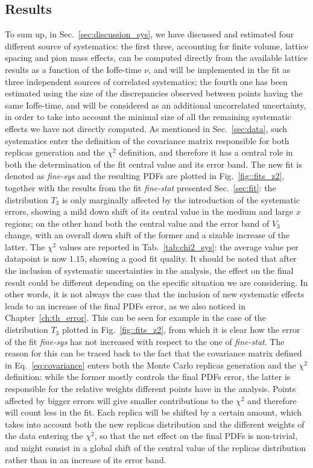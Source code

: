 \subsection{Results}
\label{sec:res}
%
To sum up, in Sec.~\ref{sec:discussion_sys}, we have discussed and estimated four different source of systematics: 
the first three, accounting for finite volume, lattice spacing and pion mass effects, can be computed directly from the available 
lattice results as a function of the Ioffe-time $\nu$, and will be implemented in the fit 
as three independent sources of correlated systematics; the fourth one has been estimated using
the size of the discrepancies observed between points having the same Ioffe-time, and will be considered
as an additional uncorrelated uncertainty, in order to take into account the minimal size of all the remaining systematic effects
we have not directly computed. 
%
As mentioned in Sec.~\ref{sec:data}, such systematics enter the definition of the covariance matrix responsible 
for both replicas generation and the $\chi^2$ definition, and therefore it has a central role in both
the determination of the fit central value and its error band.
The new fit is denoted as \textit{fine-sys} and the resulting PDFs are plotted in Fig.~\ref{fig::fits_z2}, 
together with the results from  the fit \textit{fine-stat} presented Sec.~\ref{sec:fit}:
the distribution $T_3$ is only marginally affected by the introduction of the systematic errors,
showing a mild down shift of its central value in the medium and large $x$ regions; on the other hand 
both the central value and the error band of $V_3$ change, with an overall down shift of the former and 
a sizable increase of the latter. 
The $\chi^2$ values are reported in Tab.~\ref{tab:chi2_sys}: the average value per datapoint is now $1.15$, 
showing a good fit quality.
%
It should be noted that after the inclusion of systematic uncertainties in the analysis, the effect
on the final result could be different depending on the specific situation we are considering.
In other words, it is not always the case that the inclusion of new systematic effects leads to an increase 
of the final PDFs error, as we also noticed in Chapter~\ref{ch:th_error}. This can be seen for example in the case of the distribution $T_3$ plotted in Fig.~\ref{fig::fits_z2},
from which it is clear how the error of the fit \textit{fine-sys} has not increased with respect to the one of
\textit{fine-stat}. The reason for this can be traced back to the fact that the covariance matrix 
defined in Eq.~\eqref{eq:covariance} enters both the Monte Carlo replicas generation and the $\chi^2$ definition:
while the former mostly controls the final PDFs error, 
the latter is responsible for the relative weights different points have in the analysis.
Points affected by bigger errors will give smaller contributions to the $\chi^2$ and therefore 
will count less in the fit. 
Each replica will be shifted by a certain amount, 
which takes into account both the new replicas distribution and the different weights of the data entering the
$\chi^2$, so that the net effect on the final PDFs is non-trivial, and might consist in a global shift
of the central value of the replicas distribution rather than in an increase of its error band.



